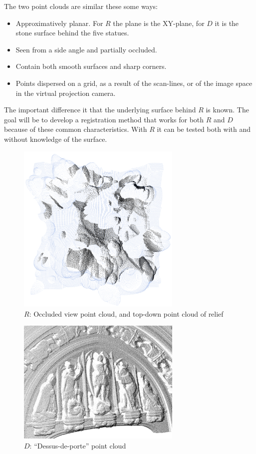 The two point clouds are similar these some ways:
\begin{itemize}
\item Approximatively planar. For $R$ the plane is the XY-plane, for $D$ it is the stone surface behind the five statues.
\item Seen from a side angle and partially occluded.
\item Contain both smooth surfaces and sharp corners.
\item Points dispersed on a grid, as a result of the scan-lines, or of the image space in the virtual projection camera.
\end{itemize}

The important difference it that the underlying surface behind $R$ is known. The goal will be to develop a registration method that works for both $R$ and $D$ because of these common characteristics. With $R$ it can be tested both with and without knowledge of the surface.

\begin{figure}[p]
\centering
\includegraphics[width=0.7\textwidth]{fig/r1_crop.png}
\caption{$R$: Occluded view point cloud, and top-down point cloud of relief}
\label{fig:relief_crop}
\end{figure}


\begin{figure}[p]
\centering
\includegraphics[width=0.7\textwidth]{fig/r1_ddp.png}
\caption{$D$: ``Dessus-de-porte'' point cloud}
\label{fig:r1_ddp}
\end{figure}



